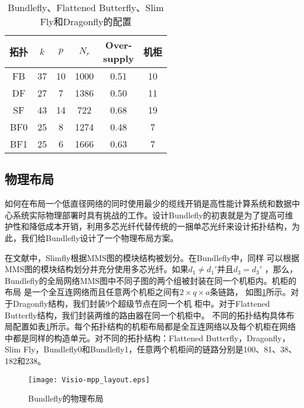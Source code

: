 \begin{table}[t]
 \centering
\caption{Bundlefly、Flattened Butterfly、Slim Fly和Dragonfly的配置}
\centering
\begin{tabular}{c| c| c|c|c| c }\hline
  \centering
  拓扑	& $k$ &$p$ & $N_r$ &\tabincell{c}{Over-\\supply} & 机柜  \\\hline
  FB &37 &10	   &1000	&0.51 &10 	 \\\hline
  DF &27 &7	&1386	&0.50 &11	  \\\hline
  SF &43 &14 	&722	&0.68 &19  	 \\\hline
  BF0 &25 &8 	&1274 	&0.48 &7	\\\hline
  BF1 &25 &6 	&1666 	&0.63 &7   \\\hline
\end{tabular}
\label{Table6}
 \end{table}


\subsection{物理布局}

如何在布局一个低直径网络的同时使用最少的缆线开销是高性能计算系统和数据中
心系统实际物理部署时具有挑战的工作。设计Bundlefly的初衷就是为了提高可维护性和降低成本开销，利用多芯光纤代替传统的一捆单芯光纤来设计拓扑结构，为此，我们给Bundlefly设计了一个物理布局方案。

在文献中，Slimfly根据MMS图的模块结构被划分。在Bundlefly中，同样
可以根据MMS图的模块结构划分并充分使用多芯光纤。如果$d_1\neq d_1'$并且$d_3=d_3'$ ，那么，Bundlefly的全局网络MMS图中不同子图的两个组被封装在同一个机柜内。机柜的布局
是一个全互连网络而且任意两个机柜之间有$2\times q \times a$条链路，
如图\ref{mpplayout}所示。对于Dragonfly结构，我们封装9个超级节点在同一个机
柜中。对于Flattened Butterfly结构，我们封装两维的路由器在同一个机柜中。
不同的拓扑结构具体布局配置如表\ref{Table6}所示。每个拓扑结构的机柜布局都是全互连网络以及每个机柜在网络中都是同样的构造单元。对不同的拓扑结构：Flattened Butterfly，Dragonfly，Slim Fly，Bundlefly0和Bundlefly1，任意两个机柜间的链路分别是100、81、38、182和238。

\begin{figure}[t]
\setlength{\belowcaptionskip}{-.5cm}%
  \centering
    \texttt{[image: Visio-mpp\_layout.eps]}
  \vspace{-.3cm}
  \caption{Bundlefly的物理布局}
  \label{mpplayout}
\end{figure}

